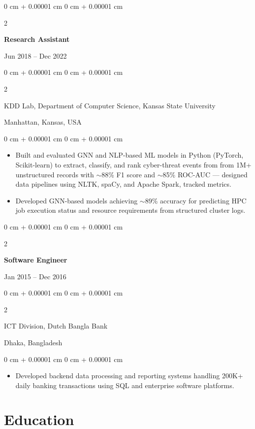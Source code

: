 \documentclass[10pt, letterpaper]{article}
\newenvironment{highlights}{
    \begin{itemize}[
        topsep=0.10 cm,
        parsep=0.10 cm,
        partopsep=0pt,
        itemsep=0pt,
        leftmargin=0 cm + 10pt
    ]
}{
    \end{itemize}
} %
\newenvironment{onecolentry}{
    \begin{adjustwidth}{
        0 cm + 0.00001 cm
    }{
        0 cm + 0.00001 cm
    }
}{
    \end{adjustwidth}
} %
\newenvironment{twocolentry}[2][]{
    \onecolentry
    \def\secondColumn{#2}
    \setcolumnwidth{\fill, 4.5 cm}
    \begin{paracol}{2}
}{
    \switchcolumn \raggedleft \secondColumn
    \end{paracol}
    \endonecolentry
} %
\begin{document}
    \vspace{1mm}

    \begin{twocolentry}{Jun 2018 -- Dec 2022}
        \textbf{Research Assistant}
    \end{twocolentry}
    \begin{twocolentry}{Manhattan, Kansas, USA}
       KDD Lab, Department of Computer Science, Kansas State University
    \end{twocolentry}
    \vspace{0.10 cm}
    \begin{onecolentry}
        \begin{highlights}
            \item Built and evaluated GNN and NLP-based ML models in Python (PyTorch, Scikit-learn) to extract, classify, and rank cyber-threat events from from 1M+ unstructured records with $\sim$88\% F1 score and $\sim$85\% ROC-AUC — designed data pipelines using NLTK, spaCy, and Apache Spark, tracked metrics.
            \item Developed GNN-based models achieving $\sim$89\% accuracy for predicting HPC job execution status and resource requirements from structured cluster logs.
        \end{highlights}
    \end{onecolentry}

    \vspace{0.1 cm}
    \begin{twocolentry}{Jan 2015 -- Dec 2016}
        \textbf{Software Engineer}
    \end{twocolentry}
    \begin{twocolentry}{Dhaka, Bangladesh}
       ICT Division, Dutch Bangla Bank
    \end{twocolentry}

    \begin{onecolentry}
        \begin{highlights}
            \item Developed backend data processing and reporting systems handling 200K+ daily banking transactions using SQL and enterprise software platforms.
        \end{highlights}
    \end{onecolentry}

\section{Education}
\end{document}
